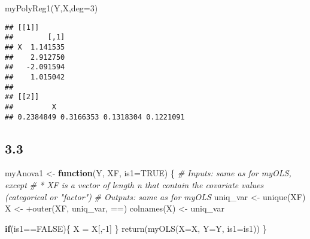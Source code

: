 \documentclass[
  11pt,
]{article}
\newenvironment{Shaded}{\begin{snugshade}}{\end{snugshade}}
\newcommand{\AttributeTok}[1]{\textcolor[rgb]{0.77,0.63,0.00}{#1}}
\newcommand{\CommentTok}[1]{\textcolor[rgb]{0.56,0.35,0.01}{\textit{#1}}}
\newcommand{\ConstantTok}[1]{\textcolor[rgb]{0.00,0.00,0.00}{#1}}
\newcommand{\ControlFlowTok}[1]{\textcolor[rgb]{0.13,0.29,0.53}{\textbf{#1}}}
\newcommand{\DecValTok}[1]{\textcolor[rgb]{0.00,0.00,0.81}{#1}}
\newcommand{\FunctionTok}[1]{\textcolor[rgb]{0.00,0.00,0.00}{#1}}
\newcommand{\NormalTok}[1]{#1}
\newcommand{\OtherTok}[1]{\textcolor[rgb]{0.56,0.35,0.01}{#1}}
\newcommand{\SpecialCharTok}[1]{\textcolor[rgb]{0.00,0.00,0.00}{#1}}
\newcommand{\StringTok}[1]{\textcolor[rgb]{0.31,0.60,0.02}{#1}}
\begin{document}
\begin{Shaded}
\begin{Highlighting}[]
\FunctionTok{myPolyReg1}\NormalTok{(Y,X,}\AttributeTok{deg=}\DecValTok{3}\NormalTok{)}
\end{Highlighting}
\end{Shaded}

\begin{verbatim}
## [[1]]
##        [,1]
## X  1.141535
##    2.912750
##   -2.091594
##    1.015042
## 
## [[2]]
##         X                               
## 0.2384849 0.3166353 0.1318304 0.1221091
\end{verbatim}

\hypertarget{section-2}{%
\subsection{3.3}\label{section-2}}

\begin{Shaded}
\begin{Highlighting}[]
\NormalTok{myAnova1 }\OtherTok{\textless{}{-}} \ControlFlowTok{function}\NormalTok{(Y, XF, }\AttributeTok{is1=}\ConstantTok{TRUE}\NormalTok{) \{}
\CommentTok{\# Inputs: same as for myOLS, except}
\CommentTok{\# * XF is a vector of length n that contain the covariate values (categorical or "factor")}
\CommentTok{\# Outputs: same as for myOLS}
\NormalTok{  uniq\_var }\OtherTok{\textless{}{-}} \FunctionTok{unique}\NormalTok{(XF)}
\NormalTok{  X }\OtherTok{\textless{}{-}} \SpecialCharTok{+}\FunctionTok{outer}\NormalTok{(XF, uniq\_var, }\StringTok{\textasciigrave{}}\AttributeTok{==}\StringTok{\textasciigrave{}}\NormalTok{)}
  \FunctionTok{colnames}\NormalTok{(X) }\OtherTok{\textless{}{-}}\NormalTok{ uniq\_var}
  
  \ControlFlowTok{if}\NormalTok{(is1}\SpecialCharTok{==}\ConstantTok{FALSE}\NormalTok{)\{}
\NormalTok{    X }\OtherTok{=}\NormalTok{ X[,}\SpecialCharTok{{-}}\DecValTok{1}\NormalTok{]}
\NormalTok{  \}}
  \FunctionTok{return}\NormalTok{(}\FunctionTok{myOLS}\NormalTok{(}\AttributeTok{X=}\NormalTok{X, }\AttributeTok{Y=}\NormalTok{Y, }\AttributeTok{is1=}\NormalTok{is1))}
\NormalTok{\}}
\end{Highlighting}
\end{Shaded}
\end{document}
